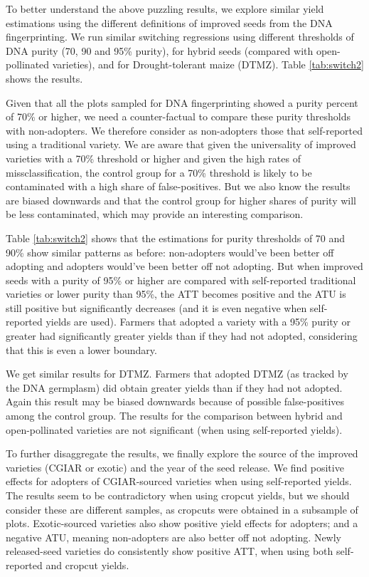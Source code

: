 \documentclass{article}
\begin{document}


To better understand the above puzzling results, we explore similar yield estimations using the different definitions of improved seeds from the DNA fingerprinting. We run similar switching regressions using different thresholds of DNA purity (70, 90 and 95\% purity), for hybrid seeds (compared with open-pollinated varieties), and for Drought-tolerant maize (DTMZ). Table \ref{tab:switch2} shows the results. 

Given that all the plots sampled for DNA fingerprinting showed a purity percent of 70\% or higher, we need a counter-factual to compare these purity thresholds with non-adopters. We therefore consider as non-adopters those that self-reported using a traditional variety. We are aware that given the universality of improved varieties with a 70\% threshold or higher and given the high rates of missclassification, the control group for a 70\% threshold is likely to be contaminated with a high share of false-positives. But we also know the results are biased downwards and that the control group for higher shares of purity will be less contaminated, which may provide an interesting comparison. 

Table \ref{tab:switch2} shows that the estimations for purity thresholds of 70 and 90\% show similar patterns as before: non-adopters would've been better off adopting and adopters would've been better off not adopting. But when improved seeds with a purity of 95\% or higher are compared with self-reported traditional varieties or lower purity than 95\%, the ATT becomes positive and the ATU is still positive but significantly decreases (and it is even negative when self-reported yields are used). Farmers that adopted a variety with a 95\% purity or greater had significantly greater yields than if they had not adopted, considering that this is even a lower boundary. 

We get similar results for DTMZ. Farmers that adopted DTMZ (as tracked by the DNA germplasm) did obtain greater yields than if they had not adopted. Again this result may be biased downwards because of possible false-positives among the control group. The results for the comparison between hybrid and open-pollinated varieties are not significant (when using self-reported yields).



To further disaggregate the results, we finally explore the source of the improved varieties (CGIAR or exotic) and the year of the seed release. We find positive effects for adopters of CGIAR-sourced varieties when using self-reported yields. The results seem to be contradictory when using cropcut yields, but we should consider these are different samples, as cropcuts were obtained in a subsample of plots. Exotic-sourced varieties also show positive yield effects for adopters; and a negative ATU, meaning non-adopters are also better off not adopting. Newly released-seed varieties do consistently show positive ATT, when using both self-reported and cropcut yields.
\end{document}
